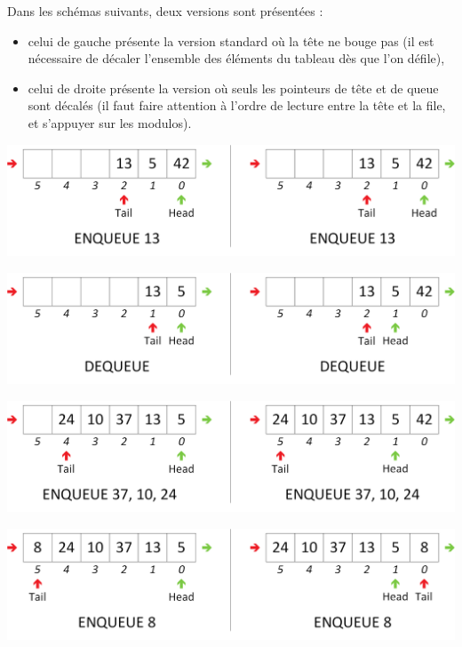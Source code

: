 \smallskip

Dans les schémas suivants, deux versions sont présentées :
\begin{itemize}
\item celui de gauche présente la version standard où la tête ne bouge pas (il est nécessaire de décaler l'ensemble des éléments du tableau dès que l'on défile),
\item celui de droite présente la version où seuls les pointeurs de tête et de queue sont décalés (il faut faire attention à l'ordre de lecture entre la tête et la file, et s'appuyer sur les modulos).
\end{itemize}

\begin{center}
\includegraphics[scale=0.65]{Cours/Files_6_Tableau_Statique_Usage_pack_2_double.png}
\end{center}

\begin{center}
\includegraphics[scale=0.65]{Cours/Files_6_Tableau_Statique_Usage_pack_3.png}
\end{center}

\begin{center}
\includegraphics[scale=0.65]{Cours/Files_6_Tableau_Statique_Usage_pack_4.png}
\end{center}

\begin{center}
\includegraphics[scale=0.65]{Cours/Files_6_Tableau_Statique_Usage_pack_5.png}
\end{center}


